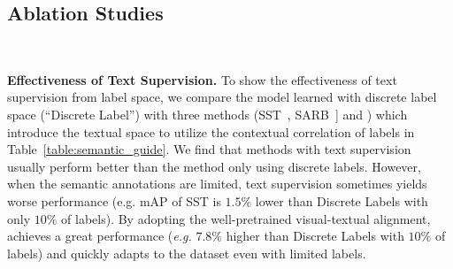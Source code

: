 \subsection{Ablation Studies}



\begin{table}
    \begin{center}
     \caption{\small \textbf{Comparison among methods on MS-COCO using partial labels with the same initialization. All methods use parameters pretrained by CLIP~\cite{radford2021learning}.}}~\label{table:semantic_guide}
    \end{center}
\vspace{-10pt}
\end{table} \textbf{Effectiveness of Text Supervision.} To show the effectiveness of text supervision from label space, we compare the model learned with discrete label space (``Discrete Label'') with three methods (SST~\cite{chen2022structured}, SARB~\cite{pu2022semantic}] and  \ours) which introduce the textual space to utilize the contextual correlation of labels in Table~\ref{table:semantic_guide}. We find that methods with text supervision usually perform better than the method only using discrete labels. However, when the semantic annotations are limited, text supervision sometimes yields worse performance (e.g. mAP of SST is $1.5\%$ lower than Discrete Labels with only $10\%$ of labels). By adopting the well-pretrained visual-textual alignment, \ours achieves a great performance (\textit{e.g.} $7.8\%$ higher than Discrete Labels with $10\%$ of labels) and quickly adapts to the dataset even with limited labels.

